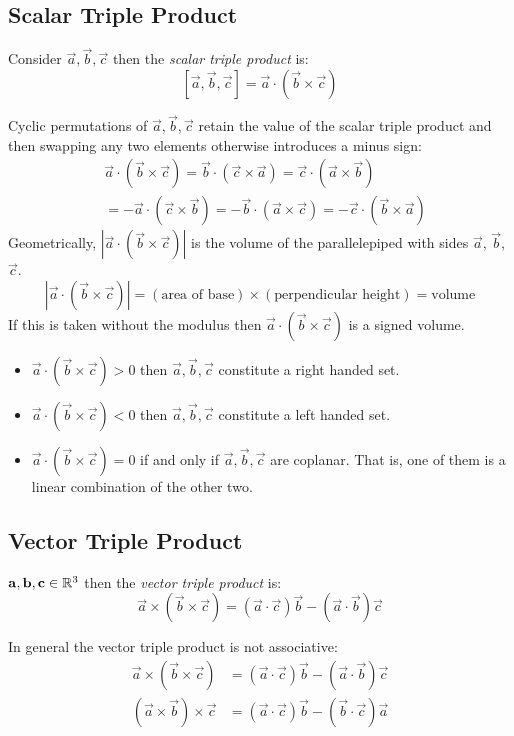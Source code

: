 \documentclass[../main.tex]{subfiles}
\begin{document}
\subsection{Scalar Triple Product}
\begin{definition}
  Consider $\vec{a}, \vec{b}, \vec{c}$ then the \textit{scalar triple product} is:
  \[
    [\vec{a}, \vec{b}, \vec{c}] = \vec{a} \cdot (\vec{b} \times \vec{c})
  \]
\end{definition}
Cyclic permutations of $\vec{a}, \vec{b}, \vec{c}$ retain the value of the scalar triple product and then swapping any two elements otherwise introduces a minus sign:
\begin{align*}
  &\vec{a} \cdot (\vec{b} \times \vec{c}) = \vec{b} \cdot (\vec{c} \times \vec{a}) = \vec{c} \cdot (\vec{a} \times \vec{b}) \\
  &= -\vec{a} \cdot (\vec{c} \times \vec{b}) = -\vec{b} \cdot (\vec{a} \times \vec{c}) = -\vec{c} \cdot (\vec{b} \times \vec{a})
\end{align*}
Geometrically, $|\vec{a} \cdot (\vec{b} \times \vec{c})|$ is the volume of the parallelepiped with sides $\vec{a}$, $\vec{b}$, $\vec{c}$.
\[
  |\vec{a} \cdot (\vec{b} \times \vec{c})| = (\text{area of base}) \times(\text{perpendicular height}) = \text{volume}
\]
If this is taken without the modulus then $\vec{a} \cdot (\vec{b} \times \vec{c})$ is a signed volume.
\begin{itemize}
  \item $\vec{a} \cdot (\vec{b} \times \vec{c}) > 0$ then $\vec{a}, \vec{b}, \vec{c}$ constitute a right handed set.
  \item $\vec{a} \cdot (\vec{b} \times \vec{c}) < 0$ then $\vec{a}, \vec{b}, \vec{c}$ constitute a left handed set.
  \item $\vec{a} \cdot (\vec{b} \times \vec{c}) = 0$ if and only if $\vec{a}, \vec{b}, \vec{c}$ are coplanar. That is, one of them is a linear combination of the other two.
\end{itemize}
\subsection{Vector Triple Product}
\begin{definition}
  $\boldsymbol{\mathbf{a}}, \boldsymbol{\mathbf{b}}, \boldsymbol{\mathbf{c}} \in \mathbb{R}^{3}$ then the \textit{vector triple product} is:
  \[
    \vec{a} \times (\vec{b} \times \vec{c}) = (\vec{a} \cdot \vec{c}) \vec{b} - (\vec{a} \cdot \vec{b}) \vec{c}
  \]
\end{definition}
\begin{remark}[Warning]
  In general the vector triple product is not associative:
  \begin{align*}
    \vec{a} \times (\vec{b} \times \vec{c}) &= (\vec{a} \cdot \vec{c}) \vec{b} - (\vec{a} \cdot \vec{b})\vec{c} \\
    (\vec{a} \times \vec{b}) \times \vec{c} &= (\vec{a} \cdot \vec{c}) \vec{b} - (\vec{b} \cdot \vec{c})\vec{a}
  \end{align*}
\end{remark}
\end{document}

